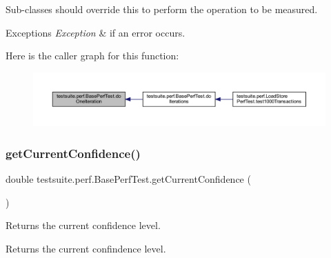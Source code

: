 Sub-\/classes should override this to perform the operation to be measured.


\begin{DoxyExceptions}{Exceptions}
{\em Exception} & if an error occurs. \\
\hline
\end{DoxyExceptions}
Here is the caller graph for this function\+:
\nopagebreak
\begin{figure}[H]
\begin{center}
\leavevmode
\includegraphics[width=350pt]{classtestsuite_1_1perf_1_1_base_perf_test_ac9682520790f17d153ad993c7bdf5bf4_icgraph}
\end{center}
\end{figure}
\mbox{\label{classtestsuite_1_1perf_1_1_base_perf_test_aafbdf56943e217d90ffd87d17c118af1}} 
\subsubsection{\texorpdfstring{get\+Current\+Confidence()}{getCurrentConfidence()}}
{\footnotesize\ttfamily double testsuite.\+perf.\+Base\+Perf\+Test.\+get\+Current\+Confidence (\begin{DoxyParamCaption}{ }\end{DoxyParamCaption})\hspace{0.3cm}{\ttfamily [protected]}}

Returns the current confidence level.

\begin{DoxyReturn}{Returns}
the current confindence level. 
\end{DoxyReturn}
\mbox{\label{classtestsuite_1_1perf_1_1_base_perf_test_a9206b0e839cce6e668eec8c2cd94bc5c}} 
